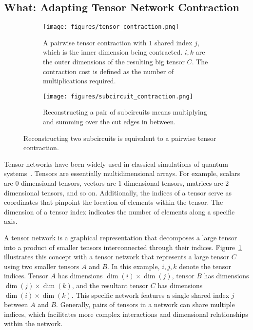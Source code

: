 \subsection{What: Adapting Tensor Network Contraction}\label{sec:tensor_network}
\begin{figure}[t]
    \centering
    \begin{subfigure}{0.4\textwidth}
        \centering
        \texttt{[image: figures/tensor\_contraction.png]}
        \caption{A pairwise tensor contraction with $1$ shared index $j$,
        which is the inner dimension being contracted.
        $i,k$ are the outer dimensions of the resulting big tensor $C$.
        The contraction cost is defined as the number of multiplications required.}
        \label{fig:tensor_contraction}
    \end{subfigure}
    \begin{subfigure}{0.4\textwidth}
        \centering
        \texttt{[image: figures/subcircuit\_contraction.png]}
        \caption{Reconstructing a pair of subcircuits means multiplying and summing over the cut edges in between.}
        \label{fig:subcircuit_contraction}
    \end{subfigure}
    \caption{Reconstructing two subcircuits is equivalent to a pairwise tensor contraction.}
    \label{fig:tensor_network_equivalence}
\end{figure}
Tensor networks have been widely used in classical simulations of quantum systems~\cite{vidal2003efficient,vidal2004efficient,schollwock2011density,verstraete2004matrix,tindall2023efficient}.
Tensors are essentially multidimensional arrays.
For example,
scalars are $0$-dimensional tensors,
vectors are $1$-dimensional tensors,
matrices are $2$-dimensional tensors, and so on.
Additionally, the indices of a tensor serve as coordinates that pinpoint the location of elements within the tensor.
The dimension of a tensor index indicates the number of elements along a specific axis.

A tensor network is a graphical representation that decomposes a large tensor into a product of smaller tensors interconnected through their indices.
Figure~\ref{fig:tensor_contraction} illustrates this concept with a tensor network that represents a large tensor $C$ using two smaller tensors $A$ and $B$.
In this example, $i, j, k$ denote the tensor indices.
Tensor $A$ has dimensions $\dim(i) \times \dim(j)$, tensor $B$ has dimensions $\dim(j) \times \dim(k)$,
and the resultant tensor $C$ has dimensions $\dim(i) \times \dim(k)$.
This specific network features a single shared index $j$ between $A$ and $B$.
Generally, pairs of tensors in a network can share multiple indices,
which facilitates more complex interactions and dimensional relationships within the network.

